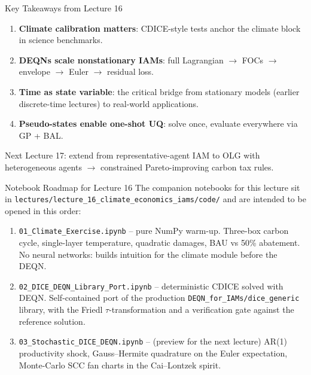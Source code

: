 \documentclass[aspectratio=169,11pt]{beamer}
\newcommand{\emphc}[1]{\textcolor{harvardcrimson}{#1}}
\begin{document}
\begin{frame}{Key Takeaways from Lecture 16}
\begin{enumerate}
    \item \textbf{Climate calibration matters}: CDICE-style tests anchor the climate block in science benchmarks.
    \item \textbf{DEQNs scale nonstationary IAMs}: full Lagrangian $\rightarrow$ FOCs $\rightarrow$ envelope $\rightarrow$ Euler $\rightarrow$ residual loss.
    \item \textbf{Time as state variable}: the critical bridge from stationary models (earlier discrete-time lectures) to real-world applications.
    \item \textbf{Pseudo-states enable one-shot UQ}: solve once, evaluate everywhere via GP + BAL.
\end{enumerate}

\vspace{0.3cm}
\begin{block}{Next}
Lecture 17: extend from representative-agent IAM to \emphc{OLG with heterogeneous agents} $\rightarrow$ constrained Pareto-improving carbon tax rules.
\end{block}
\end{frame}

\begin{frame}{Notebook Roadmap for Lecture 16}
\small
The companion notebooks for this lecture sit in \texttt{lectures/lecture\_16\_climate\_economics\_iams/code/} and are intended to be opened in this order:
\vspace{0.2cm}
\begin{enumerate}
    \item \texttt{01\_Climate\_Exercise.ipynb} -- pure NumPy warm-up. Three-box carbon cycle, single-layer temperature, quadratic damages, BAU vs 50\% abatement. No neural networks: builds intuition for the climate module before the DEQN.
    \item \texttt{02\_DICE\_DEQN\_Library\_Port.ipynb} -- deterministic CDICE solved with DEQN. Self-contained port of the production \texttt{DEQN\_for\_IAMs/dice\_generic} library, with the Friedl $\tau$-transformation and a verification gate against the reference solution.
    \item \texttt{03\_Stochastic\_DICE\_DEQN.ipynb} -- (preview for the next lecture) AR(1) productivity shock, Gauss--Hermite quadrature on the Euler expectation, Monte-Carlo SCC fan charts in the Cai--Lontzek spirit.
\end{enumerate}
\end{frame}
\end{document}
